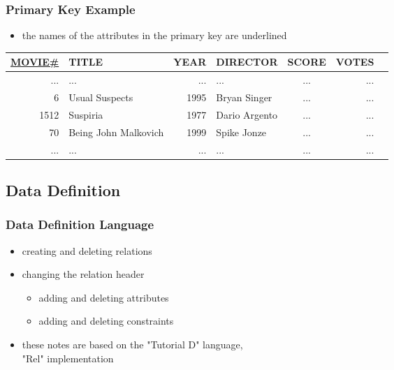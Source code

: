 \documentclass[dvipsnames]{beamer}
\theoremstyle{plain}
\begin{document}
\begin{frame}
  \frametitle{Primary Key Example}

  \begin{itemize}
    \item the names of the attributes in the primary key are underlined
  \end{itemize}

  \begin{example}
    \begin{tiny}
    \begin{table}
      \begin{tabular}{|r|l|r|l|c|r|r|}\hline
\underline{MOVIE\#} & TITLE & YEAR & DIRECTOR      & SCORE & VOTES\\\hline\hline
 ... & ...                  &  ... & ...           &   ... &   ...\\\hline
   6 & Usual Suspects       & 1995 & Bryan Singer  &   ... &   ...\\\hline
1512 & Suspiria             & 1977 & Dario Argento &   ... &   ...\\\hline
  70 & Being John Malkovich & 1999 & Spike Jonze   &   ... &   ...\\\hline
 ... & ...                  &  ... & ...           &   ... &   ...\\\hline
      \end{tabular}
    \end{table}
    \end{tiny}
  \end{example}
\end{frame}

\subsection{Data Definition}

\begin{frame}
  \frametitle{Data Definition Language}

  \begin{itemize}
    \item creating and deleting relations

    \pause
    \item changing the relation header
    \begin{itemize}
      \item adding and deleting attributes
      \item adding and deleting constraints
    \end{itemize}

    \pause
    \bigskip
    \item these notes are based on the "Tutorial D" language,\\
      "Rel" implementation
  \end{itemize}
\end{frame}
\end{document}
